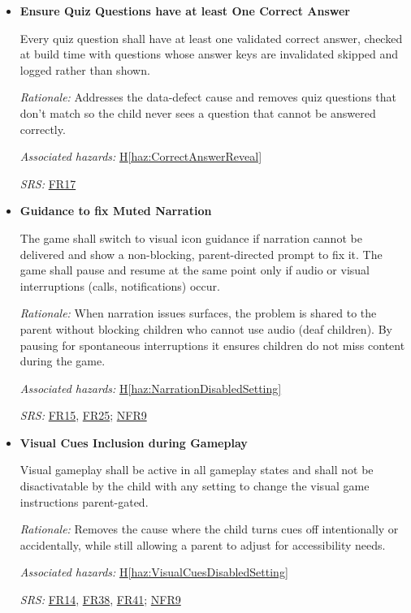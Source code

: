 \documentclass{article}
\newcounter{hazard}
\newcommand{\hazref}[1]{\hyperref[haz:#1]{H\ref*{haz:#1}}}
\newcounter{sr}
\newcommand{\srdef}[1]{\refstepcounter{sr}\label{sr:#1}\textbf{SR-\thesr:}}
\newcommand{\srsurl}{https://team-hindsight.github.io/ophthamology-game/SRS-IEEE/SRS.pdf}
\newcommand{\srsfrref}[2]{\href{\srsurl\#nameddest=#1}{FR#2}}
\newcommand{\srsnfrref}[2]{\href{\srsurl\#nameddest=#1}{NFR#2}}
\begin{document}
\begin{itemize}[leftmargin=1.5cm, labelwidth=1.3cm, labelsep=0.2cm,
  align=left, itemsep=1.2em, parsep=0.6em]
\item[\srdef{AtLeastOneCorrectAnswer}]
\textbf{Ensure Quiz Questions have at least One Correct Answer}

Every quiz question shall have at least one validated correct answer, 
checked at build time with questions whose answer keys are invalidated 
skipped and logged rather than shown.

\textit{Rationale:}
Addresses the data-defect cause and removes quiz questions that don't 
match so the child never sees a question that cannot be answered correctly.

\textit{Associated hazards:}
\hazref{CorrectAnswerReveal}

\textit{SRS:} \srsfrref{FR_ValidQuestions}{17}

\item[\srdef{NarrationMuted}]
\textbf{Guidance to fix Muted Narration}

The game shall switch to visual icon guidance if narration cannot be 
delivered and show a non-blocking, parent-directed prompt to fix it. 
The game shall pause and resume at the same point only if audio or 
visual interruptions (calls, notifications) occur.

\textit{Rationale:}
When narration issues surfaces, the problem is shared to the parent without 
blocking children who cannot use audio (deaf children). By pausing for 
spontaneous interruptions it ensures children do not miss content during the game.

\textit{Associated hazards:}
\hazref{NarrationDisabledSetting}

\textit{SRS:} \srsfrref{FR_NarrationFallback}{15}, \srsfrref{FR_Suspend}{25}; \srsnfrref{NFR_Accessibility}{9}

\item[\srdef{VisualCuesSetting}]
\textbf{Visual Cues Inclusion during Gameplay}

Visual gameplay shall be active in all gameplay states and shall not be 
disactivatable by the child with any setting to change the visual game 
instructions parent-gated.

\textit{Rationale:}
Removes the cause where the child turns cues off intentionally or accidentally, 
while still allowing a parent to adjust for accessibility needs.

\textit{Associated hazards:}
\hazref{VisualCuesDisabledSetting}

\textit{SRS:} \srsfrref{FR_VisualCues}{14}, \srsfrref{FR_ParentGate}{38}, \srsfrref{FR_Preferences}{41}; \srsnfrref{NFR_Accessibility}{9}


\end{itemize}
\end{document}
